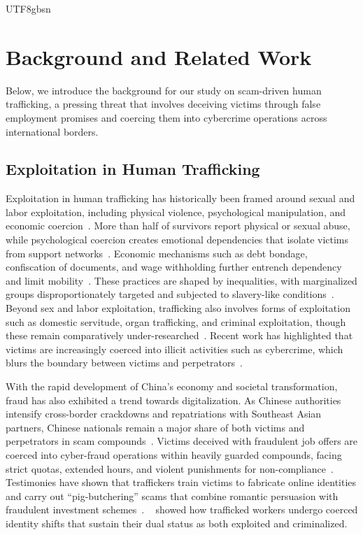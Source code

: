 \documentclass[sigconf,nonacm]{acmart}
\begin{document}
\begin{CJK}{UTF8}{gbsn}
\section{Background and Related Work}
\label{sec:related}
Below, we introduce the background for our study on scam-driven human trafficking, a pressing threat that involves deceiving victims through false employment promises and coercing them into cybercrime operations across international borders. 

\subsection{Exploitation in Human Trafficking}

Exploitation in human trafficking has historically been framed around sexual and labor exploitation, including physical violence, psychological manipulation, and economic coercion~\cite{kim2010coercion, ollus2015regulating}. More than half of survivors report physical or sexual abuse, while psychological coercion creates emotional dependencies that isolate victims from support networks~\cite{stockl2021human, oram2016prevalence, merodio2020they}. Economic mechanisms such as debt bondage, confiscation of documents, and wage withholding further entrench dependency and limit mobility~\cite{stephenson2025digital}. These practices are shaped by inequalities, with marginalized groups disproportionately targeted and subjected to slavery-like conditions~\cite{limoncelli2009trafficking, shepherd2022organizing}. Beyond sex and labor exploitation, trafficking also involves forms of exploitation such as domestic servitude, organ trafficking, and criminal exploitation, though these remain comparatively under-researched~\cite{cockbain2019human}. Recent work has highlighted that victims are increasingly coerced into illicit activities such as cybercrime, which blurs the boundary between victims and perpetrators~\cite{Wang2024}. 

With the rapid development of China's economy and societal transformation, fraud has also exhibited a trend towards digitalization. As Chinese authorities intensify cross-border crackdowns and repatriations with Southeast Asian partners, Chinese nationals remain a major share of both victims and perpetrators in scam compounds~\cite{StateCouncil2021ActionPlan}. Victims deceived with fraudulent job offers are coerced into cyber-fraud operations within heavily guarded compounds, facing strict quotas, extended hours, and violent punishments for non-compliance~\cite{hrc2023guidance, hrc2022cyberslaver}. Testimonies have shown that traffickers train victims to fabricate online identities and carry out ``pig-butchering'' scams that combine romantic persuasion with fraudulent investment schemes~\cite{sarkar2024bidirectional, Wang2024, whitty-cbs12, oak-soups25}. \citeauthor{Wang2024}~\cite{Wang2024} showed how trafficked workers undergo coerced identity shifts that sustain their dual status as both exploited and criminalized. 


\end{CJK}
\end{document}
